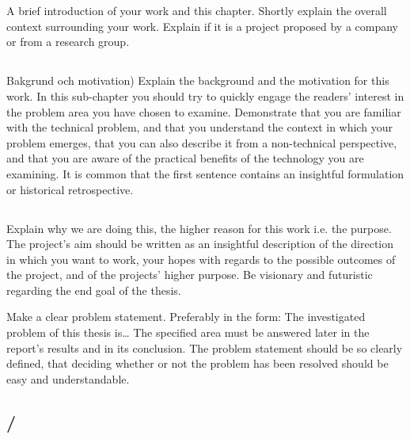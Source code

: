 \section{}\label{sec:intro} 
A brief introduction of your work and this chapter. Shortly explain the overall context surrounding
your work. Explain if it is a project proposed by a company or from a research group.

\subsection{}\label{subsec:background}
\noindent 
Bakgrund och motivation) Explain the background and the motivation for this work. In this
sub-chapter you should try to quickly engage the readers' interest in the problem area you have
chosen to examine. Demonstrate that you are familiar with the technical problem, and that you
understand the context in which your problem emerges, that you can also describe it from a
non-technical perspective, and that you are aware of the practical benefits of the technology you
are examining. It is common that the first sentence contains an insightful formulation or historical
retrospective.  

\subsection{}\label{subsec:aim}
\noindent
Explain why we are doing this, the higher reason for this work i.e. the purpose. The project's aim
should be written as an insightful description of the direction in which you want to work, your
hopes with regards to the possible outcomes of the project, and of the projects' higher purpose. Be
visionary and futuristic regarding the end goal of the thesis.

Make a clear problem statement.  Preferably in the form: The investigated problem of this thesis is…
The specified area must be answered later in the report's results and in its conclusion. The problem
statement should be so clearly defined, that deciding whether or not the problem has been resolved
should be easy and understandable.

\subsection{/
            }\label{subsec:researchquestion}

